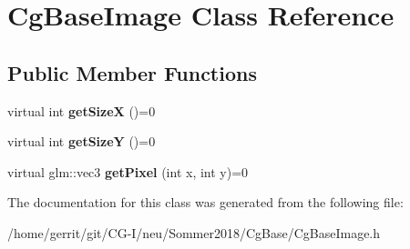 \hypertarget{class_cg_base_image}{}\section{Cg\+Base\+Image Class Reference}
\label{class_cg_base_image}
\subsection*{Public Member Functions}
\begin{DoxyCompactItemize}
\item 
\mbox{\label{class_cg_base_image_a1f97e4bcd00cc26dbcf07ff433f3c700}} 
virtual int {\bfseries get\+SizeX} ()=0
\item 
\mbox{\label{class_cg_base_image_a47d709145d7bba1f679025a0fdcdc00c}} 
virtual int {\bfseries get\+SizeY} ()=0
\item 
\mbox{\label{class_cg_base_image_a01135fbd5af8de401d2e4ceb83ce2394}} 
virtual glm\+::vec3 {\bfseries get\+Pixel} (int x, int y)=0
\end{DoxyCompactItemize}


The documentation for this class was generated from the following file\+:\begin{DoxyCompactItemize}
\item 
/home/gerrit/git/\+C\+G-\/\+I/neu/\+Sommer2018/\+Cg\+Base/Cg\+Base\+Image.\+h\end{DoxyCompactItemize}
